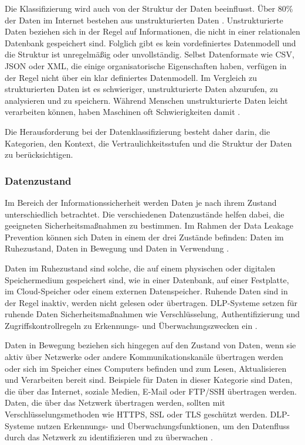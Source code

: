 Die Klassifizierung wird auch von der Struktur der Daten beeinflusst. Über 80\% der Daten im Internet bestehen aus unstrukturierten Daten \cite{Allahyari.2017}. Unstrukturierte Daten beziehen sich in der Regel auf Informationen, die nicht in einer relationalen Datenbank gespeichert sind. Folglich gibt es kein vordefiniertes Datenmodell und die Struktur ist unregelmäßig oder unvollständig. Selbst Datenformate wie CSV, JSON oder XML, die einige organisatorische Eigenschaften haben, verfügen in der Regel nicht über ein klar definiertes Datenmodell. Im Vergleich zu strukturierten Daten ist es schwieriger, unstrukturierte Daten abzurufen, zu analysieren und zu speichern. Während Menschen unstrukturierte Daten leicht verarbeiten können, haben Maschinen oft Schwierigkeiten damit \cite{Guo.2021}.

Die Herausforderung bei der Datenklassifizierung besteht daher darin, die Kategorien, den Kontext, die Vertraulichkeitsstufen und die Struktur der Daten zu berücksichtigen.

\subsubsection{Datenzustand}
Im Bereich der Informationssicherheit werden Daten je nach ihrem Zustand unterschiedlich betrachtet. Die verschiedenen Datenzustände helfen dabei, die geeigneten Sicherheitsmaßnahmen zu bestimmen. Im Rahmen der Data Leakage Prevention können sich Daten in einem der drei Zustände befinden: Daten im Ruhezustand, Daten in Bewegung und Daten in Verwendung \cite{Shabtai.2012b}.

Daten im Ruhezustand sind solche, die auf einem physischen oder digitalen Speichermedium gespeichert sind, wie in einer Datenbank, auf einer Festplatte, im Cloud-Speicher oder einem externen Datenspeicher. Ruhende Daten sind in der Regel inaktiv, werden nicht gelesen oder übertragen. DLP-Systeme setzen für ruhende Daten Sicherheitsmaßnahmen wie Verschlüsselung, Authentifizierung und Zugriffskontrollregeln zu Erkennungs- und Überwachungszwecken ein \cite{Shishodia.2022}\cite{Shabtai.2012b}.

Daten in Bewegung beziehen sich hingegen auf den Zustand von Daten, wenn sie aktiv über Netzwerke oder andere Kommunikationskanäle übertragen werden oder sich im Speicher eines Computers befinden und zum Lesen, Aktualisieren und Verarbeiten bereit sind. Beispiele für Daten in dieser Kategorie sind Daten, die über das Internet, soziale Medien, E-Mail oder FTP/SSH übertragen werden. Daten, die über das Netzwerk übertragen werden, sollten mit Verschlüsselungsmethoden wie HTTPS, SSL oder TLS geschützt werden. DLP-Systeme nutzen Erkennungs- und Überwachungsfunktionen, um den Datenfluss durch das Netzwerk zu identifizieren und zu überwachen \cite{Shishodia.2022}\cite{Shabtai.2012b}.

